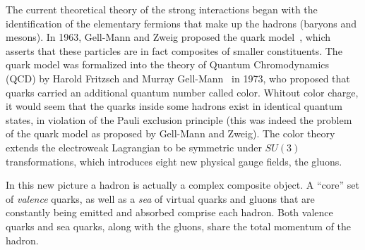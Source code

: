 The current theoretical theory of the strong interactions began with the identification of the elementary fermions that make up the hadrons (baryons and mesons). In 1963, Gell-Mann and Zweig proposed the quark model~\cite{GellMann1964214,Zweig:1964jf,Zweig2}, which asserts that these particles are in fact composites of smaller constituents.  
The quark model was formalized into the theory of Quantum Chromodynamics (QCD) by Harold Fritzsch and Murray Gell-Mann~\cite{Fritzsch1973365} in 1973, who proposed that quarks carried an additional quantum number called color.  Whitout color charge, it would seem that the quarks inside some hadrons exist in identical quantum states, in violation of the Pauli exclusion principle (this was indeed the problem of the quark model as proposed by Gell-Mann and Zweig). The color theory extends the electroweak Lagrangian to be symmetric under $SU(3)$ transformations, which introduces eight new physical gauge fields, the gluons. 

In this new picture a hadron is actually a complex composite object. A ``core'' set of \emph{valence} quarks, as well as a \emph{sea} of virtual quarks and gluons that are constantly being emitted and absorbed comprise each hadron.  %
Both valence quarks and sea quarks, along with the gluons, share the total momentum of the hadron.


